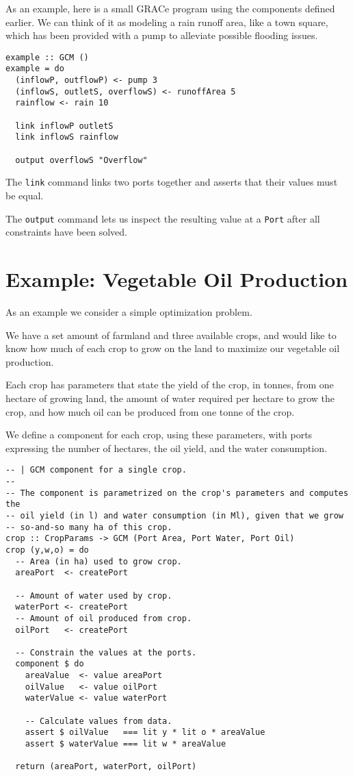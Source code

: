 \documentclass[a4paper]{article}
\begin{document}
As an example, here is a small GRACe program using the components defined
earlier. We can think of it as modeling a rain runoff area, like a
town square, which has been provided with a pump to alleviate possible
flooding issues.
%
\begin{verbatim}
example :: GCM ()
example = do
  (inflowP, outflowP) <- pump 3
  (inflowS, outletS, overflowS) <- runoffArea 5
  rainflow <- rain 10

  link inflowP outletS
  link inflowS rainflow

  output overflowS "Overflow"
\end{verbatim}
The \texttt{link} command links two ports together and asserts that their values
must be equal.

The \texttt{output} command lets us inspect the resulting value at a \texttt{Port}
after all constraints have been solved.

\section{Example: Vegetable Oil Production}
As an example we consider a simple optimization problem.

We have a set amount of farmland and three available crops, and would like to
know how much of each crop to grow on the land to maximize our vegetable oil
production.

Each crop has parameters that state the yield of the crop, in tonnes, from one 
hectare of growing land, the amount of water required per hectare to grow the 
crop, and how much oil can be produced from one tonne of the crop.

We define a component for each crop, using these parameters, with ports
expressing the number of hectares, the oil yield, and the water consumption.

\begin{verbatim}
-- | GCM component for a single crop.
--
-- The component is parametrized on the crop's parameters and computes the
-- oil yield (in l) and water consumption (in Ml), given that we grow
-- so-and-so many ha of this crop.
crop :: CropParams -> GCM (Port Area, Port Water, Port Oil)
crop (y,w,o) = do
  -- Area (in ha) used to grow crop.
  areaPort  <- createPort

  -- Amount of water used by crop.
  waterPort <- createPort
  -- Amount of oil produced from crop.
  oilPort   <- createPort

  -- Constrain the values at the ports.
  component $ do
    areaValue  <- value areaPort
    oilValue   <- value oilPort
    waterValue <- value waterPort

    -- Calculate values from data.
    assert $ oilValue   === lit y * lit o * areaValue
    assert $ waterValue === lit w * areaValue

  return (areaPort, waterPort, oilPort)
\end{verbatim}
\end{document}
